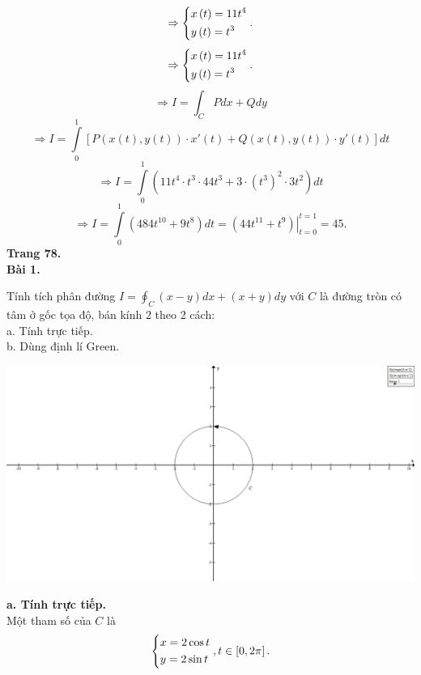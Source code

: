 \documentclass[12pt,a4paper]{article}
\begin{document}
\[ \Rightarrow \left\{ \begin{gathered}
  x\left( t \right) = 11{t^4} \hfill \\
  y\left( t \right) = {t^3} \hfill \\ 
\end{gathered}  \right..\]
\[ \Rightarrow \left\{ \begin{gathered}
  x\left( t \right) = 11{t^4} \hfill \\
  y\left( t \right) = {t^3} \hfill \\ 
\end{gathered}  \right..\]
\[ \Rightarrow I = \int_C {Pdx + Qdy} \]
\[ \Rightarrow I = \int\limits_0^1 {\left[ {P\left( {x\left( t \right),y\left( t \right)} \right) \cdot x'\left( t \right) + Q\left( {x\left( t \right),y\left( t \right)} \right) \cdot y'\left( t \right)} \right]} dt\]
\[ \Rightarrow I = \int\limits_0^1 {\left( {11{t^4} \cdot {t^3} \cdot 44{t^3} + 3 \cdot {{\left( {{t^3}} \right)}^2} \cdot 3{t^2}} \right)} dt\]
\[ \Rightarrow I = \int\limits_0^1 {\left( {484{t^{10}} + 9{t^8}} \right)} dt = \left. {\left( {44{t^{11}} + {t^9}} \right)} \right|_{t = 0}^{t = 1} = 45.\]
\textbf{Trang 78.}\\
\textbf{Bài 1.}
\begin{mybox}
Tính tích phân đường \(I = \oint_C {\left( {x - y} \right)dx + \left( {x + y} \right)dy} \) với \(C\) là đường tròn có tâm ở gốc tọa độ, bán kính \(2\) theo 2 cách:\\
a. Tính trực tiếp.\\
b. Dùng định lí Green.
\end{mybox}
\begin{center}
	\includegraphics[scale=0.3]{c4_6}
\end{center}
\textbf{a. Tính trực tiếp.}\\
Một tham số của \(C\) là
\[\left\{ \begin{gathered}
  x = 2\cos t \hfill \\
  y = 2\sin t \hfill \\ 
\end{gathered}  \right.,t \in \left[ {0,2\pi } \right].\]
\end{document}
